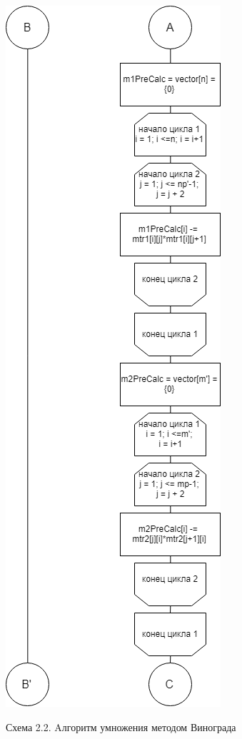 \documentclass[12pt]{report}
\begin{document}
\begin{center}
    \includegraphics[scale=0.65]{WinogradMult2}

	 Схема 2.2. Aлгоритм умножения методом Винограда


\end{center}
\end{document}

